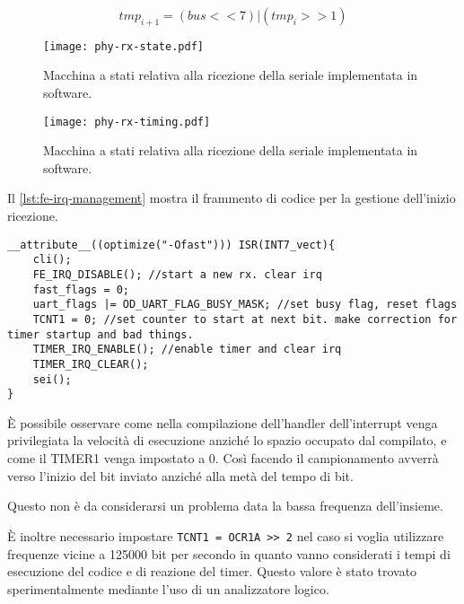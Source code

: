 \begin{equation}\label{eq:rx-push}
    tmp_{i+1} = (bus << 7) | (tmp_i >> 1)
\end{equation}

\begin{figure}[p]
    \centering
    \texttt{[image: phy-rx-state.pdf]}
    \caption[]{Macchina a stati relativa alla ricezione della seriale implementata in software.}\label{fig:phy-rx-state}
\end{figure}

\begin{figure}[p]
    \centering
    \texttt{[image: phy-rx-timing.pdf]}
    \caption[]{Macchina a stati relativa alla ricezione della seriale implementata in software.}\label{fig:phy-rx-timing}
\end{figure}

Il \cref{lst:fe-irq-management} mostra il frammento di codice per la gestione dell'inizio ricezione. 

\noindent\begin{minipage}{\textwidth}
    \begin{lstlisting}[style=C, caption={IRQ di gestione inizio trasmissione}, label=lst:fe-irq-management]
__attribute__((optimize("-Ofast"))) ISR(INT7_vect){
    cli();
    FE_IRQ_DISABLE(); //start a new rx. clear irq
    fast_flags = 0;
    uart_flags |= OD_UART_FLAG_BUSY_MASK; //set busy flag, reset flags
    TCNT1 = 0; //set counter to start at next bit. make correction for timer startup and bad things.
    TIMER_IRQ_ENABLE(); //enable timer and clear irq
    TIMER_IRQ_CLEAR();
    sei();
}
    \end{lstlisting}
\end{minipage}

È possibile osservare come nella compilazione dell'handler dell'interrupt venga privilegiata la velocità di esecuzione anziché lo spazio occupato dal compilato, e come il TIMER1 venga impostato a 0. Così facendo il campionamento avverrà verso l'inizio del bit inviato anziché alla metà del tempo di bit. 

Questo non è da considerarsi un problema data la bassa frequenza dell'insieme.

È inoltre necessario impostare \texttt{TCNT1 = OCR1A >\textcompwordmark> 2} nel caso si voglia utilizzare frequenze vicine a 125000 bit per secondo in quanto vanno considerati i tempi di esecuzione del codice e di reazione del timer. Questo valore è stato trovato sperimentalmente mediante l'uso di un analizzatore logico.

